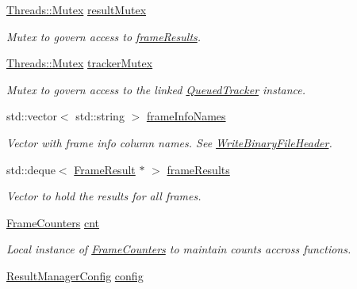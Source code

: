 \begin{DoxyCompactItemize}
\item 
\hyperlink{struct_threads_1_1_mutex}{Threads\+::\+Mutex} \hyperlink{class_result_manager_a736af7b3783f456fb05aa011bafc5bde}{result\+Mutex}
\begin{DoxyCompactList}\small\item\em Mutex to govern access to \hyperlink{class_result_manager_a2b7ba6801c7d9cfff0b4f8ee5ffc7569}{frame\+Results}. \end{DoxyCompactList}\item 
\hyperlink{struct_threads_1_1_mutex}{Threads\+::\+Mutex} \hyperlink{class_result_manager_ab8b3508ac87e3990b0b6a70c9031719d}{tracker\+Mutex}
\begin{DoxyCompactList}\small\item\em Mutex to govern access to the linked \hyperlink{class_queued_tracker}{Queued\+Tracker} instance. \end{DoxyCompactList}\item 
std\+::vector$<$ std\+::string $>$ \hyperlink{class_result_manager_a13591c71dc8de59c119c3a26de681e21}{frame\+Info\+Names}
\begin{DoxyCompactList}\small\item\em Vector with frame info column names. See \hyperlink{class_result_manager_ad67d6303de94c15cbb8de23cf1837270}{Write\+Binary\+File\+Header}. \end{DoxyCompactList}\item 
std\+::deque$<$ \hyperlink{struct_result_manager_1_1_frame_result}{Frame\+Result} $\ast$ $>$ \hyperlink{class_result_manager_a2b7ba6801c7d9cfff0b4f8ee5ffc7569}{frame\+Results}
\begin{DoxyCompactList}\small\item\em Vector to hold the results for all frames. \end{DoxyCompactList}\item 
\hyperlink{struct_result_manager_1_1_frame_counters}{Frame\+Counters} \hyperlink{class_result_manager_ad5f8491ff6c6f2e1e78f04c537c9474d}{cnt}
\begin{DoxyCompactList}\small\item\em Local instance of \hyperlink{struct_result_manager_1_1_frame_counters}{Frame\+Counters} to maintain counts accross functions. \end{DoxyCompactList}\item 
\hyperlink{struct_result_manager_config}{Result\+Manager\+Config} \hyperlink{class_result_manager_a23c07e2966ffb6b48c5c043418b4c748}{config}

\end{DoxyCompactItemize}

